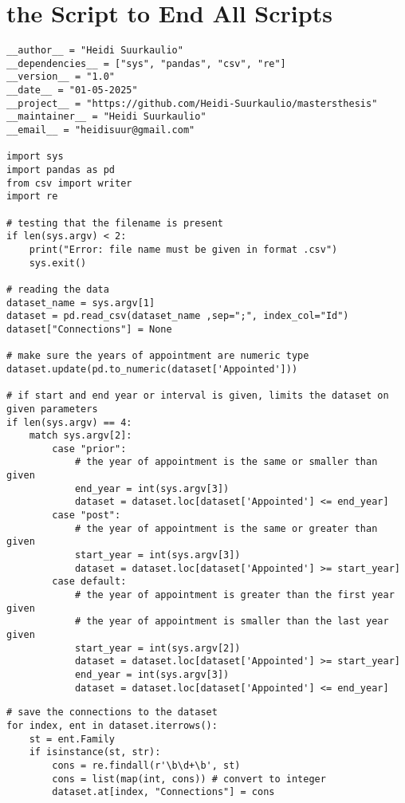 \section{the Script to End All Scripts}
\label{script}
\begin{small}
\begin{verbatim}
__author__ = "Heidi Suurkaulio"
__dependencies__ = ["sys", "pandas", "csv", "re"]
__version__ = "1.0"
__date__ = "01-05-2025"
__project__ = "https://github.com/Heidi-Suurkaulio/mastersthesis"
__maintainer__ = "Heidi Suurkaulio"
__email__ = "heidisuur@gmail.com"

import sys
import pandas as pd
from csv import writer
import re

# testing that the filename is present
if len(sys.argv) < 2:
    print("Error: file name must be given in format .csv")
    sys.exit()

# reading the data
dataset_name = sys.argv[1]
dataset = pd.read_csv(dataset_name ,sep=";", index_col="Id")
dataset["Connections"] = None

# make sure the years of appointment are numeric type
dataset.update(pd.to_numeric(dataset['Appointed']))

# if start and end year or interval is given, limits the dataset on given parameters
if len(sys.argv) == 4:
    match sys.argv[2]:
        case "prior":
            # the year of appointment is the same or smaller than given
            end_year = int(sys.argv[3])
            dataset = dataset.loc[dataset['Appointed'] <= end_year]
        case "post":
            # the year of appointment is the same or greater than given
            start_year = int(sys.argv[3])
            dataset = dataset.loc[dataset['Appointed'] >= start_year]
        case default:
            # the year of appointment is greater than the first year given
            # the year of appointment is smaller than the last year given
            start_year = int(sys.argv[2])
            dataset = dataset.loc[dataset['Appointed'] >= start_year]
            end_year = int(sys.argv[3])
            dataset = dataset.loc[dataset['Appointed'] <= end_year]       
\end{verbatim}
\pagebreak
\begin{verbatim}
# save the connections to the dataset
for index, ent in dataset.iterrows():
    st = ent.Family
    if isinstance(st, str):
        cons = re.findall(r'\b\d+\b', st)
        cons = list(map(int, cons)) # convert to integer
        dataset.at[index, "Connections"] = cons


\end{verbatim}
\end{small}
